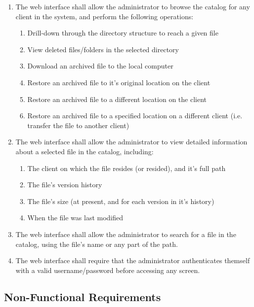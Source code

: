 \begin{enumerate}
    \item The web interface shall allow the administrator to browse the catalog
        for any client in the system, and perform the following operations:
        \begin{enumerate}
            \item Drill-down through the directory structure to reach a given
                file
            \item View deleted files/folders in the selected directory
            \item Download an archived file to the local computer
            \item Restore an archived file to it's original location on the
                client
            \item Restore an archived file to a different location on the
                client
            \item Restore an archived file to a specified location on
                a different client (i.e. transfer the file to another client)
        \end{enumerate}
    \item The web interface shall allow the administrator to view detailed
        information about a selected file in the catalog, including:
        \begin{enumerate}
            \item The client on which the file resides (or resided), and it's
                full path
            \item The file's version history
            \item The file's size (at present, and for each version in it's
                history)
            \item When the file was last modified
        \end{enumerate}
    \item The web interface shall allow the administrator to search for a file
        in the catalog, using the file's name or any part of the path.
    \item The web interface shall require that the administrator authenticates
        themself with a valid username/password before accessing any screen.

\end{enumerate}

\subsection{Non-Functional Requirements}

